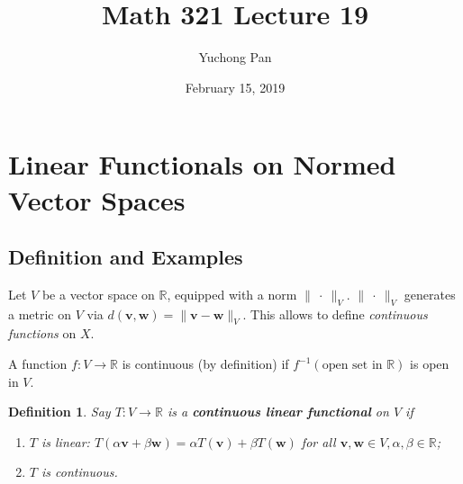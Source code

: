 \documentclass[letterpaper, reqno,11pt]{article}
\newcommand{\RR}{\mathbb{R}}
\begin{document}
\title{Math 321 Lecture 19}
\author{Yuchong Pan}
\date{February 15, 2019}
\newtheorem{thm}{Theorem}
\newtheorem{defn}{Definition}
\newtheorem*{remark}{Remark}
\newtheorem{claim}{Claim}
\newtheorem{cor}{Corollary}
\newtheorem{lemma}{Lemma}
\newtheorem{prop}{Proposition}
\maketitle
%

\section{Linear Functionals on Normed Vector Spaces}

\subsection{Definition and Examples}

Let $V$ be a vector space on $\RR$, equipped with a norm $\lVert \ \cdot \ \rVert_V$. $\lVert \ \cdot \ \rVert_V$ generates a metric on $V$ via $d(\mathbf v, \mathbf w) = \lVert \mathbf v - \mathbf w \rVert_V$. This allows to define \emph{continuous functions} on $X$.

\medskip

 A function $f : V \to \RR$ is continuous (by definition) if $f^{-1}(\text{open set in $\RR$})$ is open in $V$.

\begin{defn}
  \normalfont Say $T : V \to \RR$ is a {\bf continuous linear functional} on $V$ if
  \begin{enumerate}
  \item $T$ is linear: $T(\alpha \mathbf v + \beta \mathbf w) = \alpha T(\mathbf v) + \beta T(\mathbf w)$ for all $\mathbf v, \mathbf w \in V, \alpha, \beta \in \RR$;
  \item $T$ is continuous.
  \end{enumerate}
\end{defn}
\end{document}
